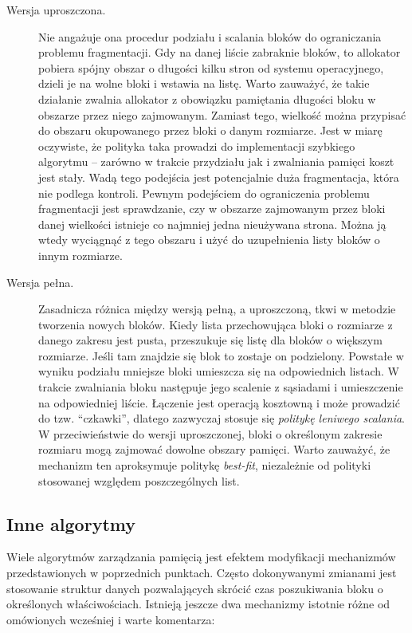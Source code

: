 \documentclass[12pt,a4paper,titlepage,twoside]{mwart}
\begin{document}
\begin{description}
\item[Wersja uproszczona.] Nie angażuje ona procedur podziału i scalania
bloków do ograniczania problemu fragmentacji. Gdy na danej liście zabraknie
bloków, to allokator pobiera spójny obszar o długości kilku stron od systemu
operacyjnego, dzieli je na wolne bloki i wstawia na listę. Warto zauważyć, że
takie działanie zwalnia allokator z obowiązku pamiętania długości bloku w
obszarze przez niego zajmowanym. Zamiast tego, wielkość można przypisać do
obszaru okupowanego przez bloki o danym rozmiarze. Jest w miarę oczywiste, że
polityka taka prowadzi do implementacji szybkiego algorytmu -- zarówno w
trakcie przydziału jak i zwalniania pamięci koszt jest stały. Wadą tego
podejścia jest potencjalnie duża fragmentacja, która nie podlega kontroli.
Pewnym podejściem do ograniczenia problemu fragmentacji jest sprawdzanie, czy w
obszarze zajmowanym przez bloki danej wielkości istnieje co najmniej jedna
nieużywana strona. Można ją wtedy wyciągnąć z tego obszaru i użyć do
uzupełnienia listy bloków o innym rozmiarze.
\vspace{1ex}

\item[Wersja pełna.] Zasadnicza różnica między wersją pełną, a uproszczoną,
tkwi w metodzie tworzenia nowych bloków. Kiedy lista przechowująca bloki o
rozmiarze z danego zakresu jest pusta, przeszukuje się listę dla bloków o
większym rozmiarze. Jeśli tam znajdzie się blok to zostaje on podzielony.
Powstałe w wyniku podziału mniejsze bloki umieszcza się na odpowiednich
listach. W trakcie zwalniania bloku następuje jego scalenie z sąsiadami i
umieszczenie na odpowiedniej liście. Łączenie jest operacją kosztowną i może
prowadzić do tzw. ``czkawki'', dlatego zazwyczaj stosuje się \textit{politykę
leniwego scalania}. W przeciwieństwie do wersji uproszczonej, bloki o
określonym zakresie rozmiaru mogą zajmować dowolne obszary pamięci.  Warto
zauważyć, że mechanizm ten aproksymuje politykę \textit{best-fit}, niezależnie
od polityki stosowanej względem poszczególnych list.

\end{description}

\subsection{Inne algorytmy}

Wiele algorytmów zarządzania pamięcią jest efektem modyfikacji mechanizmów
przedstawionych w poprzednich punktach. Często dokonywanymi zmianami jest
stosowanie struktur danych pozwalających skrócić czas poszukiwania bloku o
określonych właściwościach. Istnieją jeszcze dwa mechanizmy istotnie różne od
omówionych wcześniej i warte komentarza:
\end{document}
